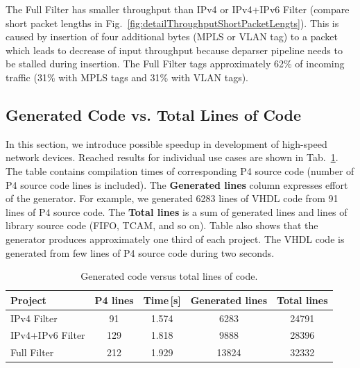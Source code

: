 The Full Filter has smaller throughput than IPv4 or IPv4+IPv6 Filter (compare short packet lengths in
Fig.~\ref{fig:detailThroughputShortPacketLengts}).
This is caused by insertion of four additional bytes (MPLS or VLAN tag) to a packet which leads to decrease of 
input throughput because deparser pipeline needs to be stalled during insertion. 
The Full Filter tags approximately 62\% of incoming traffic (31\% with MPLS tags and 31\% with VLAN tags).

\subsection{Generated Code vs. Total Lines of Code}
In this section, we introduce possible speedup in development of high-speed network devices. 
Reached results for individual use cases are shown in Tab.~\ref{tab:generatedVsTotalLines}.
The table contains compilation times of corresponding P4 source code (number of P4 source code lines is included). 
The \textbf{Generated lines} column expresses effort of the generator. For example, we generated 6283 lines of VHDL code from 91 lines
of P4 source code. The \textbf{Total lines} is a sum of generated lines and lines of library source code (FIFO, TCAM, and so on).
Table also shows that the generator produces approximately one third of each project. The VHDL code is generated from few lines
of P4 source code during two seconds.

\begin{table}[h]
    \centering
    \begin{tabular}{|l||c|c||c|c|}
        \hline
        \T \textbf{Project} & \textbf{P4 lines} & \textbf{Time\,[s]} & \textbf{Generated lines} & \textbf{Total lines} \\ \hline\hline
        \T IPv4 Filter      &        91         &       1.574        &           6283           &        24791         \\
        IPv4+IPv6 Filter    &        129        &       1.818        &           9888           &        28396         \\
        Full Filter         &        212        &       1.929        &          13824           &        32332         \\ \hline
    \end{tabular}
    \caption{Generated code versus total lines of code.}
    \label{tab:generatedVsTotalLines}
\end{table}

